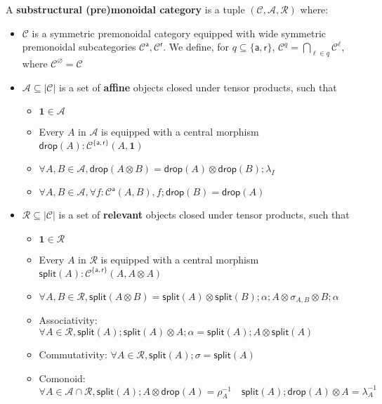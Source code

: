 \documentclass[acmsmall,screen,review]{acmart}
\newcommand{\mc}[1]{\ensuremath{\mathcal{#1}}}
\newcommand{\mb}[1]{\ensuremath{\mathbf{#1}}}
\newcommand{\ms}[1]{\ensuremath{\mathsf{#1}}}
\begin{document}
\begin{definition}
  A \textbf{substructural (pre)monoidal category} is a tuple \((\mc{C}, \mc{A},
  \mc{R})\) where:
  \begin{itemize}
    \item \(\mc{C}\) is a symmetric premonoidal category equipped with wide
    symmetric premonoidal subcategories \(\mc{C}^{\ms{a}}, \mc{C}^{\ms{r}}\).
    We define, for \(q \subseteq \{\ms{a}, \ms{r}\}\), \(\mc{C}^q = \bigcap_{\ell \in q}\mc{C}^\ell\), where \(\mc{C}^\varnothing = \mc{C}\)
    \item \(\mc{A} \subseteq |\mc{C}|\) is a set of \textbf{affine} objects
    closed under tensor products, such that
    \begin{itemize}
      \item \(\mb{1} \in \mc{A}\)
      \item Every \(A\) in \(\mc{A}\) is equipped with a central morphism
      \(\ms{drop}(A): \mc{C}^{\{\ms{a}, \ms{r}\}}(A, \mb{1})\)
      \item \(\forall A, B \in \mc{A}, \ms{drop}(A \otimes B) = \ms{drop}(A) \otimes \ms{drop}(B);\lambda_I\)
      \item \(\forall A, B \in \mc{A}, \forall f: \mc{C}^{\ms{a}}(A, B), f;\ms{drop}(B) = \ms{drop}(A)\)
    \end{itemize}
    \item \(\mc{R} \subseteq |\mc{C}|\) is a set of \textbf{relevant} objects
    closed under tensor products, such that
    \begin{itemize}
      \item \(\mb{1} \in \mc{R}\)
      \item Every \(A\) in \(\mc{R}\) is equipped with a central morphism
      \(\ms{split}(A): \mc{C}^{\{\ms{a}, \ms{r}\}}(A, A \otimes A)\)
      \item \(\forall A, B \in \mc{R}, \ms{split}(A \otimes B) = \ms{split}(A) \otimes \ms{split}(B);\alpha;A \otimes \sigma_{A, B} \otimes B;\alpha\)
      \item Associativity: \(\forall A \in \mc{R}, \ms{split}(A);\ms{split}(A) \otimes A;\alpha = \ms{split}(A);A \otimes \ms{split}(A)\)
      \item Commutativity: \(\forall A \in \mc{R}, \ms{split}(A);\sigma = \ms{split}(A)\)
      \item Comonoid: \(\forall A \in \mc{A} \cap \mc{R}, \ms{split}(A);A \otimes \ms{drop}(A) = \rho_A^{-1} \quad \ms{split}(A);\ms{drop}(A) \otimes A = \lambda_A^{-1}\)

\end{itemize}
\end{itemize}
\end{definition}
\end{document}
